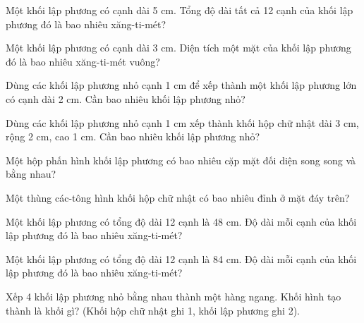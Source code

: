 \begin{ex}
Một khối lập phương có cạnh dài 5 cm. Tổng độ dài tất cả 12 cạnh của khối lập phương đó là bao nhiêu xăng-ti-mét?
\end{ex}

\begin{ex}
Một khối lập phương có cạnh dài 3 cm. Diện tích một mặt của khối lập phương đó là bao nhiêu xăng-ti-mét vuông?
\end{ex}

\begin{ex}
Dùng các khối lập phương nhỏ cạnh 1 cm để xếp thành một khối lập phương lớn có cạnh dài 2 cm. Cần bao nhiêu khối lập phương nhỏ?
\end{ex}

\begin{ex}
Dùng các khối lập phương nhỏ cạnh 1 cm xếp thành khối hộp chữ nhật dài 3 cm, rộng 2 cm, cao 1 cm. Cần bao nhiêu khối lập phương nhỏ?
\end{ex}

\begin{ex}
Một hộp phấn hình khối lập phương có bao nhiêu cặp mặt đối diện song song và bằng nhau?
\end{ex}

\begin{ex}
Một thùng các-tông hình khối hộp chữ nhật có bao nhiêu đỉnh ở mặt đáy trên?
\end{ex}

\begin{ex}
Một khối lập phương có tổng độ dài 12 cạnh là 48 cm. Độ dài mỗi cạnh của khối lập phương đó là bao nhiêu xăng-ti-mét?
\end{ex}

\begin{ex}
Một khối lập phương có tổng độ dài 12 cạnh là 84 cm. Độ dài mỗi cạnh của khối lập phương đó là bao nhiêu xăng-ti-mét?
\end{ex}

\begin{ex}
Xếp 4 khối lập phương nhỏ bằng nhau thành một hàng ngang. Khối hình tạo thành là khối gì? (Khối hộp chữ nhật ghi 1, khối lập phương ghi 2).
\end{ex}

